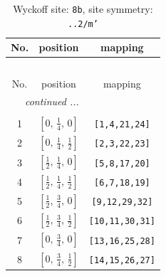 \documentclass[fleqn,8pt]{jsarticle}
\begin{document}
\begin{longtable}{ccc}
\caption{Wyckoff site: {\tt 8b}, site symmetry: {\tt ..2/m'}}
 \\
 \hline \hline
No. & position & mapping \\ \hline \endfirsthead

\multicolumn{2}{l}{\tablename\ \thetable{}} \\
 \hline \hline
No. & position & mapping \\ \hline \endhead

 \hline \hline
\multicolumn{2}{r}{\footnotesize\it continued ...} \\ \endfoot

 \hline \hline
\multicolumn{2}{r}{} \\ \endlastfoot

1 & $\left[ 0,\, \frac{1}{4},\, 0 \right]$ & {\tt [1,4,21,24]} \\ \hline
2 & $\left[ 0,\, \frac{1}{4},\, \frac{1}{2} \right]$ & {\tt [2,3,22,23]} \\ \hline
3 & $\left[ \frac{1}{2},\, \frac{1}{4},\, 0 \right]$ & {\tt [5,8,17,20]} \\ \hline
4 & $\left[ \frac{1}{2},\, \frac{1}{4},\, \frac{1}{2} \right]$ & {\tt [6,7,18,19]} \\ \hline
5 & $\left[ \frac{1}{2},\, \frac{3}{4},\, 0 \right]$ & {\tt [9,12,29,32]} \\ \hline
6 & $\left[ \frac{1}{2},\, \frac{3}{4},\, \frac{1}{2} \right]$ & {\tt [10,11,30,31]} \\ \hline
7 & $\left[ 0,\, \frac{3}{4},\, 0 \right]$ & {\tt [13,16,25,28]} \\ \hline
8 & $\left[ 0,\, \frac{3}{4},\, \frac{1}{2} \right]$ & {\tt [14,15,26,27]} \\
\end{longtable}
\renewcommand{\arraystretch}{1.2}
\end{document}
